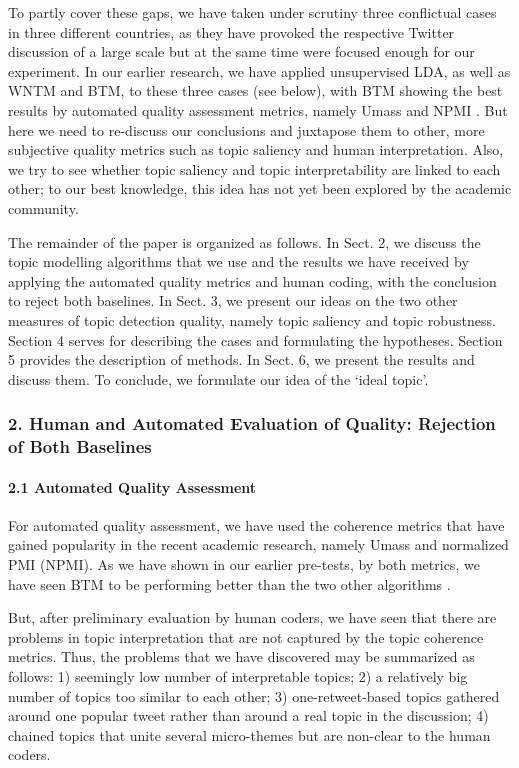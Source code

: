 To partly cover these gaps, we have taken under scrutiny three conflictual cases in three different countries, as they have provoked the respective Twitter discussion of a large scale but at the same time were focused enough for our experiment. In our earlier research, we have applied unsupervised LDA, as well as WNTM and BTM, to these three cases (see below), with BTM showing the best results by automated quality assessment metrics, namely Umass and NPMI \cite{BlekanovTarasovMaksimov}. But here we need to re-discuss our conclusions and juxtapose them to other, more subjective quality metrics such as topic saliency and human interpretation. Also, we try to see whether topic saliency and topic interpretability are linked to each other; to our best knowledge, this idea has not yet been explored by the academic community.

The remainder of the paper is organized as follows. In Sect. 2, we discuss the topic modelling algorithms that we use and the results we have received by applying the automated quality metrics and human coding, with the conclusion to reject both baselines. In Sect. 3, we present our ideas on the two other measures of topic detection quality, namely topic saliency and topic robustness. Section 4 serves for describing the cases and formulating the hypotheses. Section 5 provides the description of methods. In Sect. 6, we present the results and discuss them. To conclude, we formulate our idea of the ‘ideal topic’.

\subsubsection{2. Human and Automated Evaluation of Quality: Rejection of Both Baselines}

\paragraph{2.1 Automated Quality Assessment}

For automated quality assessment, we have used the coherence metrics that have gained popularity in the recent academic research, namely Umass and normalized PMI (NPMI). As we have shown in our earlier pre-tests, by both metrics, we have seen BTM to be performing better than the two other algorithms \cite{BlekanovTarasovMaksimov}.

But, after preliminary evaluation by human coders, we have seen that there are problems in topic interpretation that are not captured by the topic coherence metrics. Thus, the problems that we have discovered may be summarized as follows: 1) seemingly low number of interpretable topics; 2) a relatively big number of topics too similar to each other; 3) one-retweet-based topics gathered around one popular tweet rather than around a real topic in the discussion; 4) chained topics that unite several micro-themes but are non-clear to the human coders.

